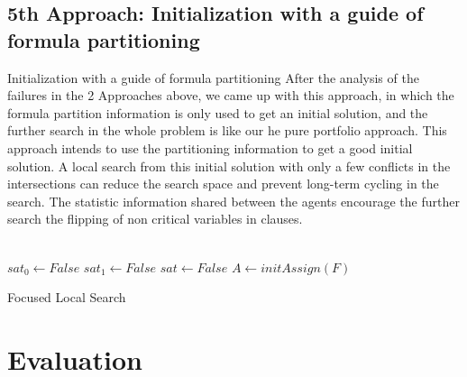 \documentclass[12pt,a4paper,twoside]{scrartcl}
\numberwithin{equation}{section}
\begin{document}
\subsection{5th Approach: Initialization with a guide of formula partitioning}
Initialization with a guide of formula partitioning
After the analysis of the failures in the 2 Approaches above, we came up with this approach, in which the formula partition information is only used to get an initial solution, and the further search in the whole problem is like our he pure portfolio approach. This approach intends to use the partitioning information to get a good initial solution.  A local search from this initial solution with only a few conflicts in the intersections can reduce the search space and prevent long-term cycling in the search. The statistic information shared between the agents encourage the further search the flipping of non critical variables in clauses. \\
\\
\begin{algorithm}[H]
  $sat_0 \leftarrow False$\;
  $sat_1 \leftarrow False$\;
  $sat \leftarrow False$\;
  $A \leftarrow initAssign(F)$\;
 \caption{Focused Local Search}
\end{algorithm}  




\clearpage
\section{Evaluation} 
\label{sec:eva}
\end{document}
